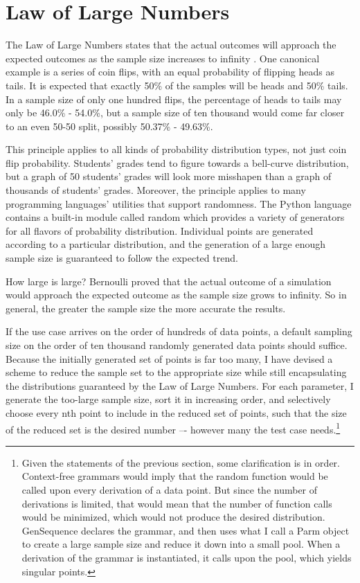 \section{Law of Large Numbers}
The Law of Large Numbers states that the actual outcomes will approach the expected outcomes as the sample size increases to infinity . One canonical example is a series of coin flips, with an equal probability of flipping heads as tails. It is expected that exactly 50\% of the samples will be heads and 50\% tails. In a sample size of only one hundred flips, the percentage of heads to tails may only be 46.0\% - 54.0\%, but a sample size of ten thousand would come far closer to an even 50-50 split, possibly 50.37\% - 49.63\%. 

This principle applies to all kinds of probability distribution types, not just coin flip probability. Students’ grades tend to figure towards a bell-curve distribution, but a graph of 50 students’ grades will look more misshapen than a graph of thousands of students’ grades. Moreover, the principle applies to many programming languages’ utilities that support randomness. The Python language contains a built-in module called random which provides a variety of generators for all flavors of probability distribution. Individual points are generated according to a particular distribution, and the generation of a large enough sample size is guaranteed to follow the expected trend.

How large is large? Bernoulli proved that the actual outcome of a simulation would approach the expected outcome as the sample size grows to infinity. So in general, the greater the sample size the more accurate the results.

If the use case arrives on the order of hundreds of data points, a default sampling size on the order of ten thousand randomly generated data points should suffice. Because the initially generated set of points is far too many, I have devised a scheme to reduce the sample set to the appropriate size while still encapsulating the distributions guaranteed by the Law of Large Numbers. For each parameter, I generate the too-large sample size, sort it in increasing order, and selectively choose every nth point to include in the reduced set of points, such that the size of the reduced set is the desired number –-  however many the test case needs.\footnote{Given the statements of the previous section, some clarification is in order. Context-free grammars would imply that the random function would be called upon every derivation of a data point. But since the number of derivations is limited, that would mean that the number of function calls would be minimized, which would not produce the desired distribution. GenSequence declares the grammar, and then uses what I call a Parm object to create a large sample size and reduce it down into a small pool. When a derivation of the grammar is instantiated, it calls upon the pool, which yields singular points.}

